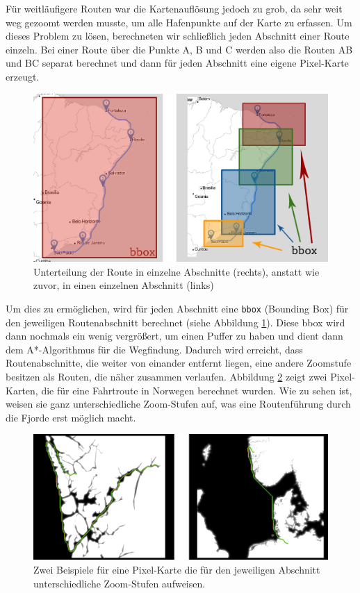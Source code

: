 \documentclass[letterpaper]{article}
\begin{document}
	Für weitläufigere Routen war die Kartenauflösung jedoch zu grob, da sehr weit weg gezoomt werden musste, um alle Hafenpunkte auf der Karte zu erfassen.
	Um dieses Problem zu lösen, berechneten wir schließlich jeden Abschnitt einer Route einzeln. Bei einer Route über die Punkte A, B und C werden also die Routen AB und BC separat berechnet und dann für jeden Abschnitt eine eigene Pixel-Karte erzeugt.

	\begin{figure}[!htbp]
		\centering
		\includegraphics[width=\linewidth]{bbox_clipping}
		\caption{Unterteilung der Route in einzelne Abschnitte (rechts), anstatt wie zuvor, in einen einzelnen Abschnitt (links)}
		\label{fig:bbox_clipping}
	\end{figure}

	Um dies zu ermöglichen, wird für jeden Abschnitt eine \texttt{bbox} (Bounding Box) für den jeweiligen Routenabschnitt berechnet (siehe Abbildung \ref{fig:bbox_clipping}). Diese bbox wird dann nochmals ein wenig vergrößert, um einen Puffer zu haben und dient dann dem A*-Algorithmus für die Wegfindung.
	Dadurch wird erreicht, dass Routenabschnitte, die weiter von einander entfernt liegen, eine andere Zoomstufe besitzen als Routen, die näher zusammen verlaufen. Abbildung \ref{fig:bbox_clipping_pixelmap} zeigt zwei Pixel-Karten, die für eine Fahrtroute in Norwegen berechnet wurden. Wie zu sehen ist, weisen sie ganz unterschiedliche Zoom-Stufen auf, was eine Routenführung durch die Fjorde erst möglich macht.

	\begin{figure}[!htbp]
		\centering
		\includegraphics[width=\linewidth]{bbox_clipping_pixelmap}
		\caption{Zwei Beispiele für eine Pixel-Karte die für den jeweiligen Abschnitt unterschiedliche Zoom-Stufen aufweisen.}
		\label{fig:bbox_clipping_pixelmap}
	\end{figure}
\end{document}
